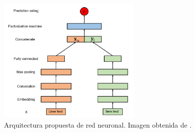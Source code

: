 \documentclass[twoside,twocolumn]{article}
\begin{document}
\begin{center}
\begin{figure}[h!]
	\includegraphics[width=7cm]{CDDNN.png}
	\caption{Arquitectura propuesta de red neuronal. Imagen obtenida de \cite{parallelNN}.}
	\label{fig:fig2}
\end{figure}
\end{center}






\renewcommand\refname{Referencias}


\end{document}

